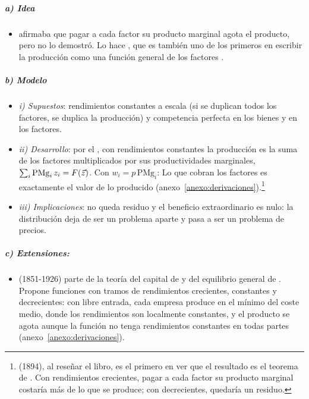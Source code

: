 \documentclass[11pt]{article}
\begin{document}
\subparagraph{a) Idea}

\begin{itemize}
\item {} afirmaba que pagar a cada factor su producto marginal agota el producto, pero no lo demostró. Lo hace  \parencite*{Wicksteed1894Essay}, que es también uno de los primeros en escribir la producción como una función general de los factores .
\end{itemize}

\subparagraph{b) Modelo}

\begin{itemize}
\item \emph{i) Supuestos}: rendimientos constantes a escala (si se duplican todos los factores, se duplica la producción) y competencia perfecta en los bienes y en los factores.
\item \emph{ii) Desarrollo}: por el , con rendimientos constantes la producción es la suma de los factores multiplicados por sus productividades marginales, $\sum_i\mathrm{PMg}_i\,z_i=F(\vec{z})$. Con $w_i=p\,\mathrm{PMg}_i$:
  Lo que cobran los factores es exactamente el valor de lo producido (anexo~\ref{anexo:derivaciones}).\footnote{ (1894), al reseñar el libro, es el primero en ver que el resultado es el teorema de \nocite{HET2026Flux}. Con rendimientos crecientes, pagar a cada factor su producto marginal costaría más de lo que se produce; con decrecientes, quedaría un residuo.}
\item \emph{iii) Implicaciones}: no queda residuo y el beneficio extraordinario es nulo: la distribución deja de ser un problema aparte y pasa a ser un problema de precios.
\end{itemize}

\subparagraph{c) Extensiones: }

\begin{itemize}
\item {} (1851-1926) parte de la teoría del capital de  y del equilibrio general de \nocite{Wicksell1936Interest}. Propone funciones con tramos de rendimientos crecientes, constantes y decrecientes: con libre entrada, cada empresa produce en el mínimo del coste medio, donde los rendimientos son localmente constantes, y el producto se agota aunque la función no tenga rendimientos constantes en todas partes\nocite{Wicksell1934Lectures}  (anexo~\ref{anexo:derivaciones}).
\end{itemize}
\end{document}

